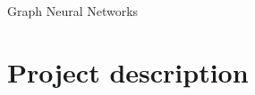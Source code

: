 \documentclass[presentation]{beamer}\mode<presentation>{\usetheme{AMSBolognaFC}}
\begin{document}
\begin{frame}[c]{Graph Neural Networks}

\end{frame}



\section{Project description}
\end{document}
